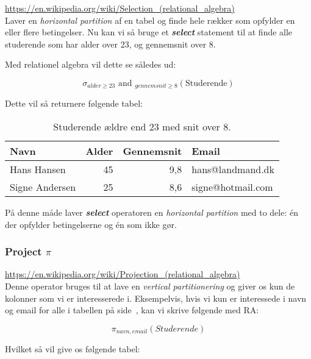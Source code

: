 \url{https://en.wikipedia.org/wiki/Selection_(relational_algebra)}\\

Laver en \textit{horizontal partition} af en tabel og finde hele rækker som opfylder en eller flere betingelser.
Nu kan vi så bruge et \textbf{\textit{select}} statement til at finde alle studerende som har alder over 23, og gennemsnit over 8.

Med relationel algebra vil dette se således ud:

\begin{equation*}
\sigma_{alder \geq 23}\text{ and } _{gennemsnit \geq 8} (\text{Studerende})
\end{equation*}

Dette vil så returnere følgende tabel:

\begin{table}[H]
	\centering
	\begin{tabular}{lrrl}
		\toprule
		\textbf{Navn}	&\textbf{Alder}&\textbf{Gennemsnit}&\textbf{Email}\\
		\midrule			
		Hans Hansen		& 45 & 9,8	& hans@landmand.dk	\\			
		Signe Andersen	& 25 & 8,6	& signe@hotmail.com	\\
		\bottomrule
	\end{tabular}
	\caption{Studerende ældre end 23 med snit over 8.}
\end{table}


På denne måde laver \textbf{\textit{select}} operatoren en \textit{horizontal partition} med to dele: én der opfylder betingelserne og én som ikke gør.

\subsubsection{Project $\pi$}

\url{https://en.wikipedia.org/wiki/Projection_(relational_algebra)}\\

Denne operator bruges til at lave en \textit{vertical partitionering} og giver os kun de kolonner som vi er interesserede i. Eksempelvis, hvis vi kun er interessede i navn og email for alle i tabellen på side~\pageref{tab:stud}, kan vi skrive følgende med RA:

\begin{equation}
\pi_{navn, email}(Studerende)
\end{equation}

Hvilket så vil give os følgende tabel:


